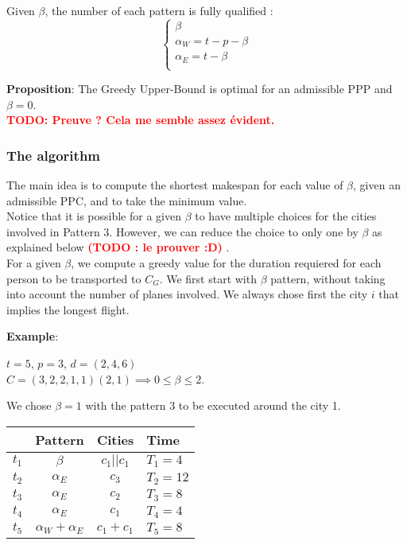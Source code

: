 \documentclass[a4paper,11pt]{article}
\newcommand{\myred}[1]
{\textcolor{red}{\bf {#1}}
}
\begin{document}
\noindent
Given $\beta$, the number of each pattern is fully qualified : 
$$
\left\{
\begin{matrix}
\beta \\
\alpha_W = t-p-\beta \\
\alpha_E = t - \beta \\
\end{matrix}\right.$$

\noindent
{\bf Proposition}: The Greedy Upper-Bound is optimal for an admissible PPP and $\beta = 0$.\\

\noindent
\myred{TODO: Preuve ? Cela me semble assez évident.}\\

\subsubsection{The algorithm}

The main idea is to compute the shortest makespan for each value of $\beta$, given an admissible PPC, and to take the minimum value.\\

\noindent
Notice that it is possible for a given $\beta$ to have multiple choices for the cities involved in Pattern 3. However, we can reduce the choice to only one by $\beta$ as explained below \myred{(TODO : le prouver :D)}.\\

\noindent
For a given $\beta$, we compute a greedy value for the duration requiered for each person to be transported to $C_G$. We first start with $\beta$ pattern, without taking into account the number of planes involved. We always chose first the city $i$ that implies the longest flight.

{\bf Example}: 

$t=5$, $p=3$, $d=(2,4,6)$\\ $C = (3,2,2,1,1)(2,1) \implies 0 \leq \beta \leq 2$. 

We chose $\beta = 1$ with the pattern 3 to be executed around the city 1.

\begin{center}
\begin{tabular}{|c||c|c|l|}
    \hline
    & Pattern & Cities & Time \tabularnewline
    \hline \hline
    $t_1$ & $\beta$ & $c_1 || c_1$ & $T_1=4$  \tabularnewline 
    \hline \hline
    $t_2$ & $\alpha_E$ & $c_3$ & $T_2=12$  \tabularnewline 
    \hline
    $t_3$ & $\alpha_E$ & $c_2$ & $T_3=8$  \tabularnewline
    \hline
    $t_4$ & $\alpha_E$ & $c_1$ & $T_4=4$  \tabularnewline
    \hline \hline
    $t_5$ & $\alpha_W + \alpha_E$ & $c_1+c_1$ & $T_5=8$  \tabularnewline
    \hline
 \end{tabular}
\end{center}
\end{document}
